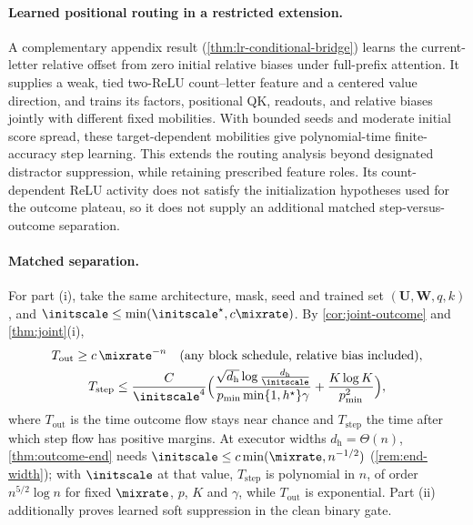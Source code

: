 \paragraph{Learned positional routing in a restricted extension.}
A complementary appendix result (\cref{thm:lr-conditional-bridge}) learns the current-letter
relative offset from zero initial relative biases under full-prefix attention. It supplies a weak,
tied two-ReLU count--letter feature and a centered value direction, and trains its factors,
positional QK, readouts, and relative biases jointly with different fixed mobilities. With bounded
seeds and moderate initial score spread, these target-dependent mobilities give polynomial-time
finite-accuracy step learning. This extends the routing analysis beyond designated distractor
suppression, while retaining prescribed feature roles. Its count-dependent ReLU activity does
not satisfy the initialization hypotheses used for the outcome plateau, so it does not supply
an additional matched step-versus-outcome separation.

\paragraph{Matched separation.} For part (i), take the same architecture, mask, seed and trained set $(\mathbf U,\mathbf W,q,k)$, and $\initscale\le\min(\initscale^\star,c\mixrate)$.
By \cref{cor:joint-outcome} and \cref{thm:joint}(i),
\begin{gather*}
 T_{\mathrm{out}}\ge c\,\mixrate^{-n}\quad\text{(any block schedule, relative bias included)},\\
 T_{\mathrm{step}}\le\frac{C}{\initscale^4}\Bigl(\frac{\sqrt{d_{\mathrm h}}\log\frac{d_{\mathrm h}}{\initscale}}{p_{\min}\min\{1,h^\star\}\gamma}+\frac{K\log K}{p_{\min}^2}\Bigr),
\end{gather*}
where $T_{\mathrm{out}}$ is the time outcome flow stays near chance and $T_{\mathrm{step}}$ the time after which step flow has positive margins. At executor
widths $d_{\mathrm h}=\Theta(n)$, \cref{thm:outcome-end} needs $\initscale\le c\min(\mixrate,n^{-1/2})$ (\cref{rem:end-width}); with $\initscale$ at that value, $T_{\mathrm{step}}$ is polynomial
in $n$, of order $n^{5/2}\log n$ for fixed $\mixrate$, $p$, $K$ and $\gamma$, while $T_{\mathrm{out}}$ is exponential. Part (ii) additionally proves learned soft suppression in the clean binary gate.

\suppressfloats[t]
